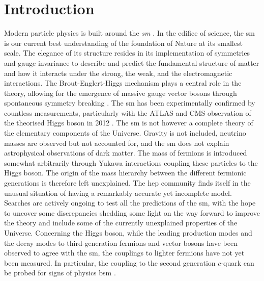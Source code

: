 \chapter{\color{oxfordblue} Introduction}
\ChapFrame

Modern particle physics is built around the \textit{\gls{sm}} \cite{Schwartz_2013, SMphysics}. In the edifice of science, the \gls{sm} is our current best understanding of the foundation of Nature at its smallest scale. The elegance of its structure resides in its implementation of symmetries and gauge invariance to describe and predict the fundamental structure of matter and how it interacts under the strong, the weak, and the electromagnetic interactions. The Brout-Englert-Higgs mechanism plays a central role in the theory, allowing for the emergence of massive gauge vector bosons through spontaneous symmetry breaking \cite{Englert:1964et,  PhysRevLett.13.508}. The \gls{sm} has been experimentally confirmed by countless measurements, particularly with the ATLAS and CMS observation of the theorised Higgs boson in 2012 \cite{ATLAS:2012yve, CMS:2012qbp}. The \gls{sm} is not however a complete theory of the elementary components of the Universe. Gravity is not included, neutrino masses are observed but not accounted for, and the \gls{sm} does not explain astrophysical observations of dark matter. The mass of fermions is introduced somewhat arbitrarily through Yukawa interactions coupling these particles to the Higgs boson. The origin of the mass hierarchy between the different fermionic generations is therefore left unexplained. The \gls{hep} community finds itself in the unusual situation of having a remarkably accurate yet incomplete model. Searches are actively ongoing to test all the predictions of the \gls{sm}, with the hope to uncover some discrepancies shedding some light on the way forward to improve the theory and include some of the currently unexplained properties of the Universe. Concerning the Higgs boson, while the leading production modes and the decay modes to third-generation fermions and vector bosons have been observed to agree with the \gls{sm}, the couplings to lighter fermions have not yet been measured. In particular, the coupling to the second generation $c$-quark can be probed for signs of physics \gls{bsm} \cite{PhysRevD.89.033014,PhysRevD.92.033016,Botella:2016krk,PhysRevD.98.055001,GHOSH2016504,PhysRevLett.123.031802,PhysRevD.100.115041}. \\

